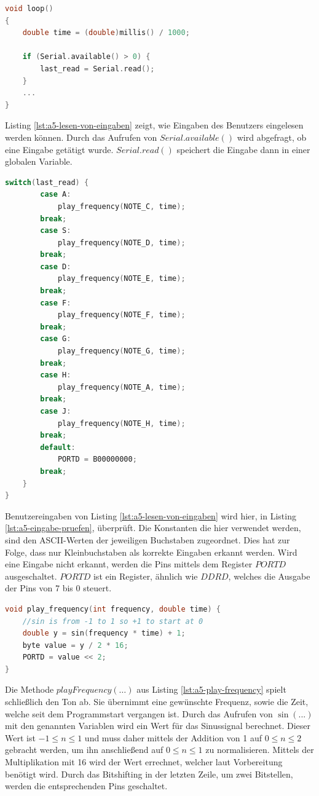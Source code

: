 \begin{lstlisting}[language=C,label={lst:a5-lesen-von-eingaben}, caption={Lesen von Eingaben}]
void loop()
{
    double time = (double)millis() / 1000;

    if (Serial.available() > 0) {
        last_read = Serial.read();
    }
    ...
}
\end{lstlisting}

Listing \ref{lst:a5-lesen-von-eingaben} zeigt, wie Eingaben des Benutzers eingelesen werden können.
Durch das Aufrufen von $Serial.available()$ wird abgefragt, ob eine Eingabe getätigt wurde.
$Serial.read()$ speichert die Eingabe dann in einer globalen Variable.

\begin{lstlisting}[language=C,label={lst:a5-eingabe-pruefen}, caption={Prüfen von Eingaben}]
    switch(last_read) {
        case A:
            play_frequency(NOTE_C, time);
        break;
        case S:
            play_frequency(NOTE_D, time);
        break;
        case D:
            play_frequency(NOTE_E, time);
        break;
        case F:
            play_frequency(NOTE_F, time);
        break;
        case G:
            play_frequency(NOTE_G, time);
        break;
        case H:
            play_frequency(NOTE_A, time);
        break;
        case J:
            play_frequency(NOTE_H, time);
        break;
        default:
            PORTD = B00000000;
        break;
    }
}
\end{lstlisting}

Benutzereingaben von Listing \ref{lst:a5-lesen-von-eingaben} wird hier, in Listing \ref{lst:a5-eingabe-pruefen}, überprüft.
Die Konstanten die hier verwendet werden, sind den ASCII-Werten der jeweiligen Buchstaben zugeordnet.
Dies hat zur Folge, dass nur Kleinbuchstaben als korrekte Eingaben erkannt werden.
Wird eine Eingabe nicht erkannt, werden die Pins mittels dem Register $PORTD$ ausgeschaltet.
$PORTD$ ist ein Register, ähnlich wie $DDRD$, welches die Ausgabe der Pins von 7 bis 0 steuert.

\begin{lstlisting}[language=C,label={lst:a5-play-frequency}, caption={Abspielen von Frequenzen}]
void play_frequency(int frequency, double time) {
    //sin is from -1 to 1 so +1 to start at 0
    double y = sin(frequency * time) + 1;
    byte value = y / 2 * 16;
    PORTD = value << 2;
}
\end{lstlisting}

Die Methode $playFrequency(\dots)$ aus Listing \ref{lst:a5-play-frequency} spielt schließlich den Ton ab.
Sie übernimmt eine gewünschte Frequenz, sowie die Zeit, welche seit dem Programmstart vergangen ist.
Durch das Aufrufen von $\sin(...)$ mit den genannten Variablen wird ein Wert für das Sinussignal berechnet.
Dieser Wert ist $-1 \leq n \leq 1$ und muss daher mittels der Addition von 1 auf  $0 \leq n \leq 2$ gebracht werden, um ihn anschließend auf $0 \leq n \leq 1$ zu normalisieren.
Mittels der Multiplikation mit 16 wird der Wert errechnet, welcher laut Vorbereitung benötigt wird.
Durch das Bitshifting in der letzten Zeile, um zwei Bitstellen, werden die entsprechenden Pins geschaltet.

